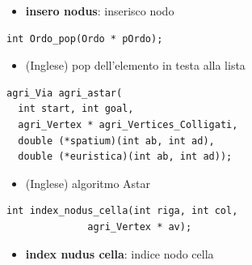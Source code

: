 \documentclass[8pt]{book}
\begin{document}
\begin{itemize}
\item
  \textbf{insero nodus}: inserisco nodo
\end{itemize}

\begin{spacing}{0.9}
  \begin{small}
    \begin{tcolorbox}
\begin{verbatim}
int Ordo_pop(Ordo * pOrdo);
\end{verbatim}
  \end{tcolorbox}
    \end{small}
      \end{spacing}

\begin{itemize}

\item
  (Inglese) pop dell'elemento in testa alla lista
\end{itemize}

\begin{spacing}{0.9}
  \begin{small}
    \begin{tcolorbox}
\begin{verbatim}
agri_Via agri_astar(
  int start, int goal,
  agri_Vertex * agri_Vertices_Colligati,
  double (*spatium)(int ab, int ad),
  double (*euristica)(int ab, int ad));
\end{verbatim}
  \end{tcolorbox}
    \end{small}
      \end{spacing}

\begin{itemize}

\item
  (Inglese) algoritmo Astar
\end{itemize}

\begin{spacing}{0.9}
  \begin{small}
    \begin{tcolorbox}
\begin{verbatim}
int index_nodus_cella(int riga, int col,
		      agri_Vertex * av);
\end{verbatim}
  \end{tcolorbox}
    \end{small}
      \end{spacing}

\begin{itemize}

\item
  \textbf{index nudus cella}: indice nodo cella
\end{itemize}
\end{document}
